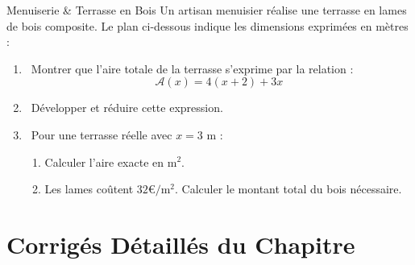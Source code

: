 \begin{sujetdnb}{Menuiserie \& Terrasse en Bois}
Un artisan menuisier réalise une terrasse en lames de bois composite. Le plan ci-dessous indique les dimensions exprimées en mètres :

\begin{center}
\end{center}

\begin{enumerate}
    \item \capSApproprier\ Montrer que l'aire totale de la terrasse s'exprime par la relation :
    \[ \mathcal{A}(x) = 4(x + 2) + 3x \]
    \item \capRealiser\ Développer et réduire cette expression.
    \item \capValider\ Pour une terrasse réelle avec $x = 3\text{ m}$ :
    \begin{enumerate}
        \item Calculer l'aire exacte en $\text{m}^2$.
        \item Les lames coûtent $32\euro/\text{m}^2$. Calculer le montant total du bois nécessaire.
    \end{enumerate}
\end{enumerate}
\lignesreponse[6]
\end{sujetdnb}

\section{Corrigés Détaillés du Chapitre}

